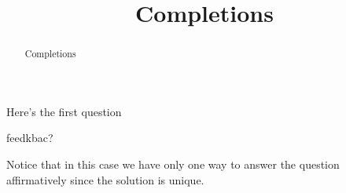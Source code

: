 \documentclass{ximera}
\title{Completions}
\begin{document}
\begin{abstract}
  Completions
\end{abstract}
\maketitle

\begin{example}
  \begin{question}
    Here's the first question
    \begin{multipleChoice}
    \end{multipleChoice}
    feedkbac?
    \begin{feedback}[correct]
      \begin{question}
        \begin{multipleChoice}
        \end{multipleChoice}

        \begin{feedback}[correct]
          Notice that in this case we have only one way to answer the
          question affirmatively since the solution is unique.
        \end{feedback}
      \end{question}
    \end{feedback}
  \end{question}
\end{example}
\end{document}
